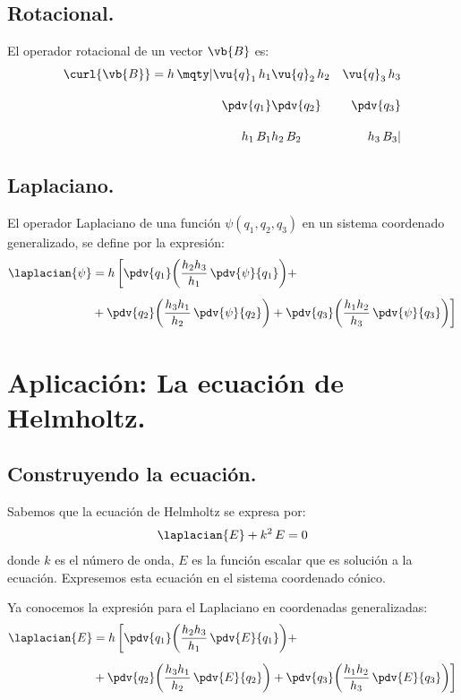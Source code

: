 \subsection{Rotacional.}

El operador rotacional de un vector $\vb{B}$ es:
\begin{align*}
\curl{\vb{B}} = h \, \mqty|
\vu{q}_{1} \, h_{1} & \vu{q}_{2} \, h_{2} & \vu{q}_{3} \, h_{3} \\[1em]
\displaystyle \pdv{q_{1}} & \displaystyle \pdv{q_{2}} & \displaystyle \pdv{q_{3}} \\[1em]
h_{1} \, B_{1} & h_{2} \, B_{2} & h_{3} \, B_{3}
|
\end{align*}

\subsection{Laplaciano.}

El operador Laplaciano de una función $\psi (q_{1}, q_{2}, q_{3})$ en un sistema coordenado generalizado, se define por la expresión:
\begin{align*}
\laplacian{\psi} &= h \, \bigg[ \pdv{q_{1}} \bigg( \dfrac{h_{2} h_{3}}{h_{1}} \, \pdv{\psi}{q_{1}} \bigg) + \\[0.5em]
&+ \pdv{q_{2}} \bigg( \dfrac{h_{3} h_{1}}{h_{2}} \, \pdv{\psi}{q_{2}} \bigg) + \pdv{q_{3}} \bigg( \dfrac{h_{1} h_{2}}{h_{3}} \, \pdv{\psi}{q_{3}} \bigg) \bigg]
\end{align*}

\section{Aplicación: La ecuación de Helmholtz.}

\subsection{Construyendo la ecuación.}

Sabemos que la ecuación de Helmholtz se expresa por:
\begin{align*}
\laplacian{E} + k^{2} \, E = 0
\end{align*}
donde $k$ es el número de onda, $E$ es la función escalar que es solución a la ecuación. Expresemos esta ecuación en el sistema coordenado cónico.
\par
Ya conocemos la expresión para el Laplaciano en coordenadas generalizadas:
\begin{align*}
\laplacian{E} &= h \,  \bigg[ \pdv{q_{1}} \bigg( \dfrac{h_{2} h_{3}}{h_{1}} \, \pdv{E}{q_{1}} \bigg) + \\[0.5em]
&+ \pdv{q_{2}} \bigg( \dfrac{h_{3} h_{1}}{h_{2}} \, \pdv{E}{q_{2}} \bigg) + \pdv{q_{3}} \bigg( \dfrac{h_{1} h_{2}}{h_{3}} \, \pdv{E}{q_{3}} \bigg) \bigg]
\end{align*}

